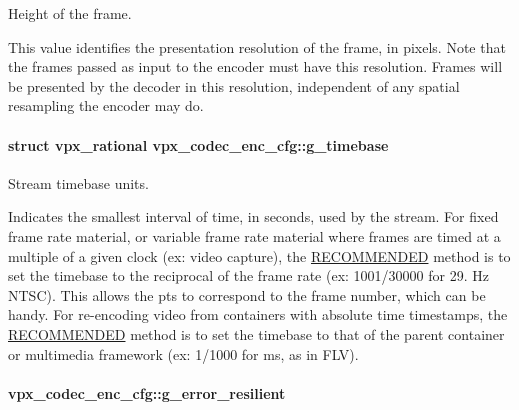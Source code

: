 Height of the frame. 

This value identifies the presentation resolution of the frame, in pixels. Note that the frames passed as input to the encoder must have this resolution. Frames will be presented by the decoder in this resolution, independent of any spatial resampling the encoder may do. \hypertarget{structvpx__codec__enc__cfg_a6498d378e4c29ef3e22258289e481087}{
\paragraph[{g\+\_\+timebase}]{\setlength{\rightskip}{0pt plus 5cm}struct {\bf vpx\+\_\+rational} vpx\+\_\+codec\+\_\+enc\+\_\+cfg\+::g\+\_\+timebase}}\label{structvpx__codec__enc__cfg_a6498d378e4c29ef3e22258289e481087}


Stream timebase units. 

Indicates the smallest interval of time, in seconds, used by the stream. For fixed frame rate material, or variable frame rate material where frames are timed at a multiple of a given clock (ex\+: video capture), the \hyperlink{rfc2119_RECOMMENDED}{R\+E\+C\+O\+M\+M\+E\+N\+D\+E\+D} method is to set the timebase to the reciprocal of the frame rate (ex\+: 1001/30000 for 29. Hz N\+T\+S\+C). This allows the pts to correspond to the frame number, which can be handy. For re-\/encoding video from containers with absolute time timestamps, the \hyperlink{rfc2119_RECOMMENDED}{R\+E\+C\+O\+M\+M\+E\+N\+D\+E\+D} method is to set the timebase to that of the parent container or multimedia framework (ex\+: 1/1000 for ms, as in F\+L\+V). \hypertarget{structvpx__codec__enc__cfg_a4e17173b66ca0d7dfba9978625d7ba76}{
\paragraph[{g\+\_\+error\+\_\+resilient}]{ vpx\+\_\+codec\+\_\+enc\+\_\+cfg\+::g\+\_\+error\+\_\+resilient}}\label{structvpx__codec__enc__cfg_a4e17173b66ca0d7dfba9978625d7ba76}


